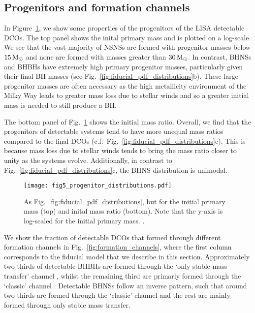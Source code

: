 \subsection{Progenitors and formation channels}\label{sec:progenitors_and_formation}

In Figure~\ref{fig:progenitor_properties}, we show some properties of the progenitors of the LISA detectable DCOs. The top panel shows the inital primary mass and is plotted on a log-scale. We see that the vast majority of NSNSs are formed with progenitor masses below $15 \unit{M_{\rm \odot}}$ and none are formed with masses greater than $30 \unit{M_{\rm \odot}}$. In contrast, BHNSs and BHBHs have extremely high primary progenitor masses, particularly given their final BH masses (see Fig.~\ref{fig:fiducial_pdf_distributions}b). These large progenitor masses are often necessary as the high metallicity environment of the Milky Way leads to greater mass loss due to stellar winds and so a greater initial mass is needed to still produce a BH.

The bottom panel of Fig.~\ref{fig:progenitor_properties} shows the initial mass ratio. Overall, we find that the progenitors of detectable systems tend to have more unequal mass ratios compared to the final DCOs (c.f.\ Fig.~\ref{fig:fiducial_pdf_distributions}c). This is because mass loss due to stellar winds tends to bring the mass ratio closer to unity as the systems evolve. Additionally, in contrast to Fig.~\ref{fig:fiducial_pdf_distributions}c, the BHNS distribution is unimodal.

\begin{figure}[htb]
    \centering
    \texttt{[image: fig5\_progenitor\_distributions.pdf]}
    \caption{As Fig.~\ref{fig:fiducial_pdf_distributions}, but for the initial primary mass (top) and inital mass ratio (bottom). Note that the y-axis is log-scaled for the initial primary mass. \href{https://github.com/TomWagg/detecting-DCOs-in-LISA/blob/main/paper/figures/fig5_progenitor_distributions.pdf}{\faFileImage} \href{https://github.com/TomWagg/detecting-DCOs-in-LISA/blob/main/paper/figure_notebooks/fiducial.ipynb}{\faBook}.}
    \label{fig:progenitor_properties}
\end{figure}

We show the fraction of detectable DCOs that formed through different formation channels in Fig.~\ref{fig:formation_channels}, where the first column corresponds to the fiducial model that we describe in this section. Approximately two thirds of detectable BHBHs are formed through the `only stable mass transfer' channel \citep{vandenHeuvel+2017}, whilst the remaining third are primarly formed through the `classic' channel \citep{Bhattacharya+1991}. Detectable BHNSs follow an inverse pattern, such that around two thirds are formed through the `classic' channel and the rest are mainly formed through only stable mass transfer.

